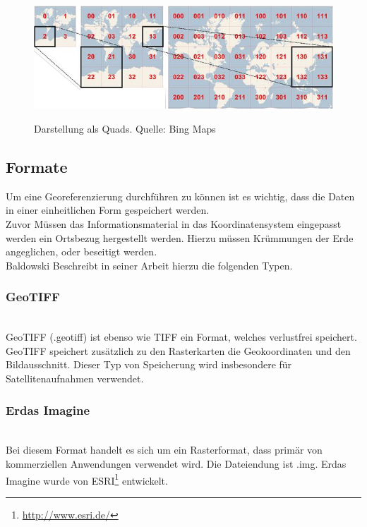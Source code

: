 \documentclass[10pt,conference,compsocconf]{IEEEtran}
\begin{document}
\begin{figure}[H]
  \centering
  	\includegraphics[width=\columnwidth]{img/bing_quads}\\
  \caption[]{Darstellung als Quads. Quelle: Bing Maps\cite{waldbiomasse}}
  \label{img:bing_quads}
\end{figure}

\subsection{Formate}
Um eine Georeferenzierung durchführen zu können ist es wichtig, dass die Daten in einer einheitlichen Form gespeichert werden.\\
Zuvor Müssen das Informationsmaterial in das Koordinatensystem eingepasst werden ein Ortsbezug hergestellt werden. Hierzu müssen Krümmungen der Erde angeglichen, oder beseitigt werden.\\
Baldowski Beschreibt in seiner Arbeit hierzu die folgenden Typen.

\subsubsection{GeoTIFF}\hspace*{\fill} \\
GeoTIFF (.geotiff) ist ebenso wie TIFF ein Format, welches verlustfrei speichert. GeoTIFF speichert zusätzlich zu den Rasterkarten die Geokoordinaten und den Bildausschnitt. Dieser Typ von Speicherung wird insbesondere für Satellitenaufnahmen verwendet.

\subsubsection{Erdas Imagine}\hspace*{\fill} \\
Bei diesem Format handelt es sich um ein Rasterformat, dass primär von kommerziellen Anwendungen verwendet wird. Die Dateiendung ist .img. Erdas Imagine wurde von ESRI\footnote{\url{http://www.esri.de/}} entwickelt.
\end{document}
